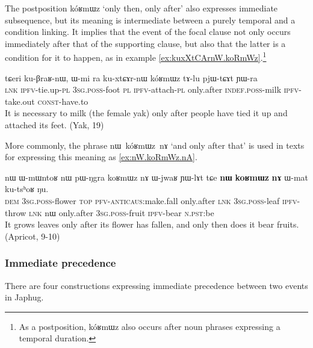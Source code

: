\documentclass[oldfontcommands,oneside,a4paper,11pt]{article}
\newcommand{\ipa}[1]{{\phon \mbox{#1}}} %
\begin{document}
The postposition \ipa{kóʁmɯz} `only then, only after' also expresses immediate subsequence, but its meaning is intermediate between a purely temporal and a condition linking. It implies that the event of the focal clause not only occurs immediately after that of the supporting clause, but also that the latter is a condition for it to happen, as  in example \ref{ex:kuxXtCArnW.koRmWz}.\footnote{As a postposition, \ipa{kóʁmɯz} also occurs after noun phrases expressing a temporal duration.}


\begin{exe}
\ex \label{ex:kuxXtCArnW.koRmWz}
\gll
\ipa{tɕeri}  	\ipa{ku-βraʁ-nɯ,}  	\ipa{ɯ-mi}  	\ipa{ra}  	\ipa{ku-xtɕɤr-nɯ}  	\ipa{kóʁmɯz}  	\ipa{tɤ-lu}  	\ipa{pjɯ-tɕɤt}  	\ipa{ɲɯ-ra}  \\
\textsc{lnk} \textsc{ipfv}-tie.up-\textsc{pl} \textsc{3sg.poss}-foot \textsc{pl} \textsc{ipfv}-attach-\textsc{pl} only.after \textsc{indef.poss}-milk \textsc{ipfv}-take.out  \textsc{const}-have.to \\
\glt It is necessary to milk (the female yak) only after people have tied it up and attached its feet. (Yak, 19)
\end{exe}

More commonly, the phrase \ipa{nɯ kóʁmɯz nɤ} `and only after that' is used in texts for expressing this meaning as \ref{ex:nW.koRmWz.nA}.
\begin{exe}
\ex \label{ex:nW.koRmWz.nA}
\gll
\ipa{nɯ}  	\ipa{ɯ-mɯntoʁ}  	\ipa{nɯ}  	\ipa{pɯ-ŋgra}  	\ipa{koʁmɯz}  	\ipa{nɤ}  	\ipa{ɯ-jwaʁ}  	\ipa{ɲɯ-lɤt}  	\ipa{tɕe}  	\ipa{\textbf{nɯ}}  	\ipa{\textbf{koʁmɯz}}  	\ipa{\textbf{nɤ}}  	\ipa{ɯ-mat}  	\ipa{ku-tsʰoʁ}  	\ipa{ŋu.}  	\\
\textsc{dem} \textsc{3sg.poss}-flower \textsc{top} \textsc{pfv}-\textsc{anticaus}:make.fall only.after \textsc{lnk} \textsc{3sg.poss}-leaf \textsc{ipfv}-throw \textsc{lnk}  	\ipa{nɯ} only.after \textsc{3sg.poss}-fruit \textsc{ipfv}-bear \textsc{n.pst}:be \\
\glt It grows leaves only after its flower has fallen, and only then does it bear fruits. (Apricot, 9-10)
\end{exe}


\subsubsection{Immediate precedence}
There are four constructions expressing immediate precedence between two events in Japhug. 
\end{document}
